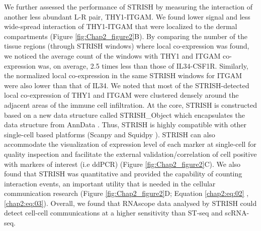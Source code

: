 We further assessed the performance of STRISH by measuring the interaction of another less abundant L-R pair, THY1-ITGAM. We found lower signal and less wide-spread interaction of THY1-ITGAM that were localized to the dermal compartments (Figure \ref{fig:Chap2_figure2}B). By comparing the number of the tissue regions (through STRISH windows) where local co-expression was found, we noticed the average count of the windows with THY1 and ITGAM co-expression was, on average, 2.5 times less than those of IL34-CSF1R. Similarly, the normalized local co-expression in the same STRISH windows for ITGAM were also lower than that of IL34. We noted that most of the STRISH-detected local co-expression of THY1 and ITGAM were clustered densely around the adjacent areas of the immune cell infiltration. At the core, STRISH is constructed based on a new data structure called STRISH\_Object which encapsulates the data structure from AnnData \cite{wolf2018scanpy}. Thus, STRISH is highly compatible with other single-cell based platforms (\ie Scanpy \cite{wolf2018scanpy} and Squidpy \cite{palla2022squidpy}). STRISH can also accommodate the visualization of expression level of each marker at single-cell for quality inspection and facilitate the external validation/correlation of cell positive with markers of interest (i.e ddPCR) (Figure \ref{fig:Chap2_figure2}C). We also found that STRISH was quantitative and provided the capability of counting interaction events, an important utility that is needed in the cellular communication research (Figure \ref{fig:Chap2_figure2}D; Equation \ref{chap2:eq:02} ,\ref{chap2:eq:03}). Overall, we found that RNAscope data analysed by STRISH could detect cell-cell communications at a higher sensitivity than ST-seq and scRNA-seq. 
